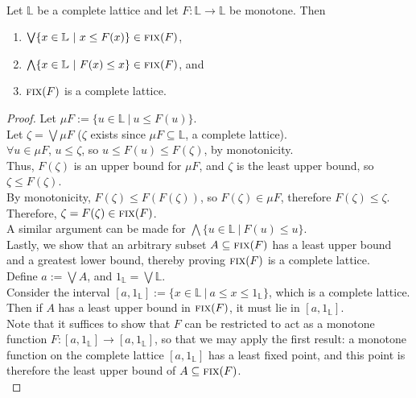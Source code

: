 \begin{thm} ~\\
    Let $\mathbb{L}$ be a complete lattice and let $F: \mathbb{L} \to \mathbb{L}$ be monotone. Then
    \begin{enumerate}
    \item $\bigvee \{ x \in \mathbb{L} \ \vert \ x \leq F(x) \} \in \textsc{fix}(F)$,
    \item $\bigwedge \{ x \in \mathbb{L} \ \vert \ F(x) \leq x \} \in \textsc{fix}(F)$, and
    \item $\textsc{fix}(F)$ is a complete lattice.
    \end{enumerate}
\label{thm:tarski}
\end{thm}

\begin{proof}
    Let $\mu F := \{ u \in \mathbb{L} \ \vert \ u \leq F(u) \}$.\\
    Let $\zeta = \bigvee \mu F$ ($\zeta$ exists since $\mu F \subseteq \mathbb{L}$, a complete lattice).\\
    $\forall u \in \mu F$, $u \leq \zeta$, so $u \leq F(u) \leq F(\zeta)$, by monotonicity.\\Thus, $F(\zeta)$ is an upper bound for $\mu F$, and $\zeta$ is the least upper bound, so $\zeta \leq F(\zeta)$.\\
    By monotonicity, $F(\zeta) \leq F(F(\zeta))$, so $F(\zeta) \in \mu F$, therefore $F(\zeta) \leq \zeta$.\\
    Therefore, $\zeta = F(\zeta) \in \textsc{fix}(F)$.\\
    A similar argument can be made for $\bigwedge \{ u \in \mathbb{L} \ \vert \ F(u) \leq u \}$.\\
    Lastly, we show that an arbitrary subset $A \subseteq \textsc{fix}(F)$ has a least upper bound and a greatest lower bound, thereby proving $\textsc{fix}(F)$ is a complete lattice.\\
    Define $a:=\bigvee A$, and $1_\mathbb{L} = \bigvee \mathbb{L}$.\\
    Consider the interval $[a,1_\mathbb{L}] := \{ x \in \mathbb{L} \ \vert \ a \leq x \leq 1_\mathbb{L} \}$, which is a complete lattice.\\
    Then if $A$ has a least upper bound in $\textsc{fix}(F)$, it must lie in $[a,1_\mathbb{L}]$.\\
    Note that it suffices to show that $F$ can be restricted to act as a monotone function
    $F:[a,1_\mathbb{L}] \to [a,1_\mathbb{L}]$, so that we may apply the first result: a monotone function on the complete lattice $[a,1_\mathbb{L}]$ has a least fixed point, and this point is therefore the least upper bound of $A \subseteq \textsc{fix}(F)$.\\

\end{proof}
